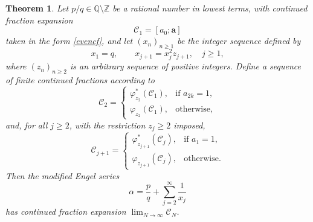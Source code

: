 \documentclass[10pt, a4paper]{amsart}
\numberwithin{equation}{section}
\newcommand\al{{\alpha}}
\theoremstyle{plain}
\newtheorem{thm}{Theorem}[section]
\theoremstyle{definition}
\newcommand{\Z}{\mathbb{Z}}
\newcommand{\Q}{\mathbb{Q}}
\begin{document}
\begin{thm}\label{modstreng}
Let $p/q\in\Q\setminus\Z$ be a rational number in lowest 
terms, with continued fraction expansion 
\[ 
\mathcal{C}_1 = [a_0; \mathbf{a}] 
\] 
taken in the form \eqref{evencf}, and let $(x_n)_{n\geq 1}$ be the integer 
sequence defined by 
\[
x_1=q, \qquad x_{j+1}=x_j^2 z_{j+1}, \quad j\geq 1, 
\] 
where $(z_n)_{n\geq 2} $ is an arbitrary 
sequence of positive integers. Define a 
sequence of finite 
continued fractions according to 
\[ 
\mathcal{C}_2 = 
\begin{cases}
  \varphi_{z_2}^*(\mathcal{C}_1), & \text{if $a_{2k}=1$},\\
   \varphi_{z_2}(\mathcal{C}_1), & \text{otherwise},
\end{cases}
\]  
and, for all $j\geq 2$, with  
 the restriction $z_j\geq 2$ imposed, 
\[ 
\mathcal{C}_{j+1} = 
\begin{cases}
  \varphi_{z_{j+1}}^*(\mathcal{C}_j), & \text{if $a_{1}=1$},\\
   \varphi_{z_{j+1}}(\mathcal{C}_j), & \text{otherwise}.
\end{cases}
\] 
Then the modified Engel series 
\begin{equation} 
\label{alstreng} 
\al = \frac{p}{q}+\sum_{j=2}^\infty \frac{1}{x_j}
\end{equation} 
has continued fraction expansion $\lim_{N\to\infty}\mathcal{C}_N$. 
\end{thm} 
\end{document}
